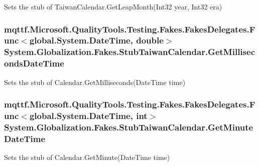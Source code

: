 Sets the stub of Taiwan\-Calendar.\-Get\-Leap\-Month(\-Int32 year, Int32 era)

\hypertarget{class_system_1_1_globalization_1_1_fakes_1_1_stub_taiwan_calendar_ae5c03cd2e2ba3f9dad2fb0d37b4f7e01}{
\subsubsection[{Get\-Milliseconds\-Date\-Time}]{\setlength{\rightskip}{0pt plus 5cm}mqttf.\-Microsoft.\-Quality\-Tools.\-Testing.\-Fakes.\-Fakes\-Delegates.\-Func$<$global.\-System.\-Date\-Time, double$>$ System.\-Globalization.\-Fakes.\-Stub\-Taiwan\-Calendar.\-Get\-Milliseconds\-Date\-Time}}\label{class_system_1_1_globalization_1_1_fakes_1_1_stub_taiwan_calendar_ae5c03cd2e2ba3f9dad2fb0d37b4f7e01}


Sets the stub of Calendar.\-Get\-Milliseconds(\-Date\-Time time)

\hypertarget{class_system_1_1_globalization_1_1_fakes_1_1_stub_taiwan_calendar_a12c27e19366489da1c7bc0935a018e35}{
\subsubsection[{Get\-Minute\-Date\-Time}]{\setlength{\rightskip}{0pt plus 5cm}mqttf.\-Microsoft.\-Quality\-Tools.\-Testing.\-Fakes.\-Fakes\-Delegates.\-Func$<$global.\-System.\-Date\-Time, int$>$ System.\-Globalization.\-Fakes.\-Stub\-Taiwan\-Calendar.\-Get\-Minute\-Date\-Time}}\label{class_system_1_1_globalization_1_1_fakes_1_1_stub_taiwan_calendar_a12c27e19366489da1c7bc0935a018e35}


Sets the stub of Calendar.\-Get\-Minute(\-Date\-Time time)

